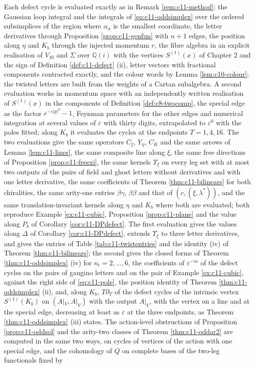 \begin{remark}
\label{rem:c11-oddmethod}
Each defect cycle is evaluated exactly as in Remark \ref{rem:c11-method}: the Gaussian loop integral and the integrals of \eqref{eq:c11-oddsimplex} over the ordered subsimplices of the region where $\alpha_\sigma$ is the smallest coordinate, the letter derivatives through Proposition \ref{prop:c11-genfun} with $n+1$ edges, the position along $\eta$ and $K_b$ through the injected momentum $r$, the fibre algebra in an explicit realisation of $V_{10}$ and $\Sigma$ over $\mathbb Q(i)$ with the vertices $S^{(1)}(x)$ of Chapter 2 and the sign of Definition \ref{def:c11-defect} (ii), letter vectors with fractional components contracted exactly, and the colour words by Lemma \ref{lem:c10-colour}; the twisted letters are built from the weights of a Cartan subalgebra. A second evaluation works in momentum space with an independently written realisation of $S^{(1)}(x)$ in the components of Definition \ref{def:c8-twocomp}, the special edge as the factor $e^{-\varepsilon|p|^2}-1$, Feynman parameters for the other edges and numerical integration at several values of $\varepsilon$ with thirty digits, extrapolated to $\varepsilon^0$ with the poles fitted; along $K_b$ it evaluates the cycles at the endpoints $T=1,4,16$. The two evaluations give the same operators $C_\xi$, $Y_\eta$, $C_K$ and the same arrows of Lemma \ref{lem:c11-lines}, the same composite line along $\xi$, the same free directions of Proposition \ref{prop:c11-freexi}, the same kernels $\Upsilon_\xi$ on every leg set with at most two outputs of the pairs of field and ghost letters without derivatives and with one letter derivative, the same coefficients of Theorem \ref{thm:c11-bilinears} for both chiralities, the same arity-one entries $\beta\gamma$, $\beta\beta$ and that of $(c,(\xi,\lambda^*))$, and the same translation-invariant kernels along $\eta$ and $K_b$ where both are evaluated; both reproduce Example \ref{ex:c11-cubic}, Proposition \ref{prop:c11-plane} and the value along $P_b$ of Corollary \ref{cor:c11-DPdefect}. The first evaluation gives the values along $\Delta$ of Corollary \ref{cor:c11-DPdefect}, extends $\Upsilon_\xi$ to three letter derivatives, and gives the entries of Table \ref{tab:c11-twistentries} and the identity (iv) of Theorem \ref{thm:c11-bilinears}; the second gives the closed forms of Theorem \ref{thm:c11-oddsimplex} (iv) for $n_t=2,\dots,6$, the coefficients of $\varepsilon^{-m}$ of the defect cycles on the pairs of gaugino letters and on the pair of Example \ref{ex:c11-cubic}, against the right side of \eqref{eq:c11-pole}, the position identity of Theorem \ref{thm:c11-oddsimplex} (ii), and, along $K_b$, $T\partial_T$ of the defect cycles of the intrinsic vertex $S^{(1)}(K_b)$ on $(A|_V,A|_V)$ with the output $A|_V$, with the vertex on a line and at the special edge, decreasing at least as $\varepsilon$ at the three endpoints, as Theorem \ref{thm:c11-oddsimplex} (iii) states. The action-level obstructions of Proposition \ref{prop:c11-oddsol} and the arity-two classes of Theorem \ref{thm:c11-oddar2} are computed in the same two ways, on cycles of vertices of the action with one special edge, and the cohomology of $Q$ on complete bases of the two-leg functionals fixed by 
\end{remark}

